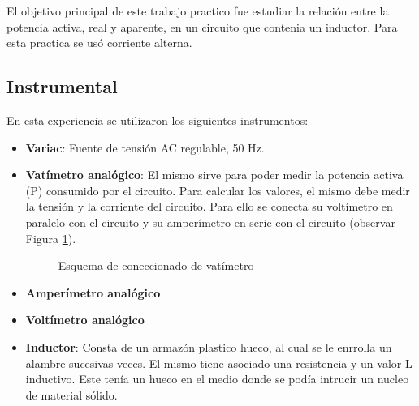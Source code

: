 \documentclass{article}
\begin{document}
        El objetivo principal de este trabajo practico fue estudiar la relación entre la potencia activa, real y aparente, en un circuito que contenia un inductor.
        Para esta practica se usó corriente alterna. 
    

        \subsection{Instrumental}

        En esta experiencia se utilizaron los siguientes instrumentos:

        \begin{itemize}
            \renewcommand{\labelitemi}{$\bullet$}
            \item {\bfseries Variac}: Fuente de tensión AC regulable, 50 Hz.
            \item {\bfseries Vatímetro analógico}: El mismo sirve para poder medir la potencia activa (P) consumido por el circuito.
                    Para calcular los valores, el mismo debe medir la tensión y la corriente del circuito. Para ello se conecta su voltímetro en paralelo con el circuito y su amperímetro en serie con el circuito (observar Figura \ref{fig:vatimetro}). \par

                    \begin{figure}[h!] %
                        \centering
                        \caption{Esquema de coneccionado de vatímetro}
                        \label{fig:vatimetro}
                    \end{figure}
            \item {\bfseries Amperímetro analógico}
            \item {\bfseries Voltímetro analógico}
            \item {\bfseries Inductor}: Consta de un armazón plastico hueco, al cual se le enrrolla un alambre sucesivas veces. El mismo tiene asociado una resistencia y un valor L inductivo. 
                Este tenía un hueco en el medio donde se podía intrucir un nucleo de material sólido. 
        \end{itemize}
        
\end{document}
